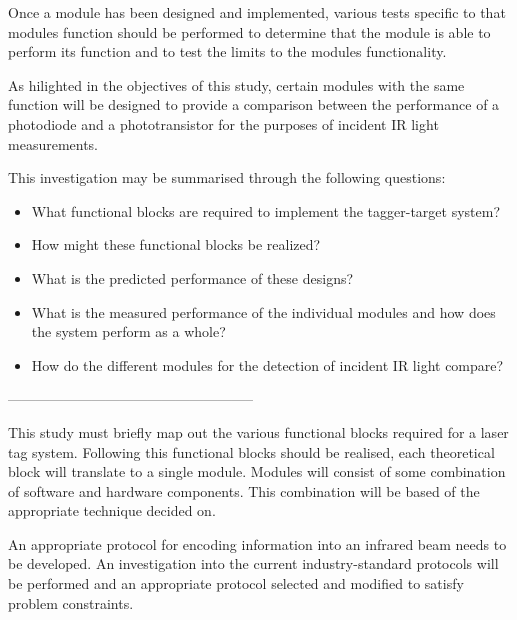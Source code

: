 Once a module has been designed and implemented, various tests specific to that modules function should be performed to determine that the module is able to perform its function and to test the limits to the modules functionality.

As hilighted in the objectives of this study, certain modules with the same function will be designed to provide a comparison between the performance of a photodiode and a phototransistor for the purposes of incident IR light measurements.

This investigation may be summarised through the following questions:

\begin{itemize}
	\item What functional blocks are required to implement the tagger-target system?
	\item How might these functional blocks be realized?
	\item What is the predicted performance of these designs?
	\item What is the measured performance of the individual modules and how does the system perform as a whole?
	\item How do the different modules for the detection of incident IR light compare?
%	
\end{itemize}


\iffalse

-----------------------------------------------------

This study must briefly map out the various functional blocks required for a laser tag system. Following this functional blocks should be realised, each theoretical block will translate to a single module. Modules will consist of some combination of software and hardware components. This combination will be based of the appropriate technique decided on.

An appropriate protocol for encoding information into an infrared beam needs to be developed. An investigation into the current industry-standard protocols will be performed and an appropriate protocol selected and modified to satisfy problem constraints.

